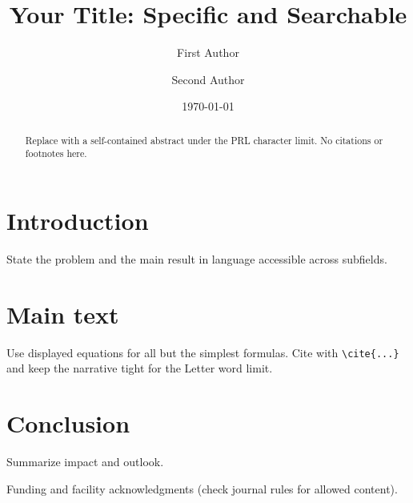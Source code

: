 \documentclass[%
  aps,%
  prl,%
  twocolumn,%
  superscriptaddress,%
  longbibliography%
]{revtex4-2}
\begin{document}
\title{Your Title: Specific and Searchable}

\author{First Author}

\author{Second Author}

\date{\today}

\begin{abstract}
Replace with a self-contained abstract under the PRL character limit. No citations or footnotes here.
\end{abstract}

\maketitle

\section{Introduction}

State the problem and the main result in language accessible across subfields.

\section{Main text}

Use displayed equations for all but the simplest formulas. Cite with \verb|\cite{...}| and keep the narrative tight for the Letter word limit.


\section{Conclusion}

Summarize impact and outlook.

\begin{acknowledgments}
Funding and facility acknowledgments (check journal rules for allowed content).
\end{acknowledgments}



\end{document}
